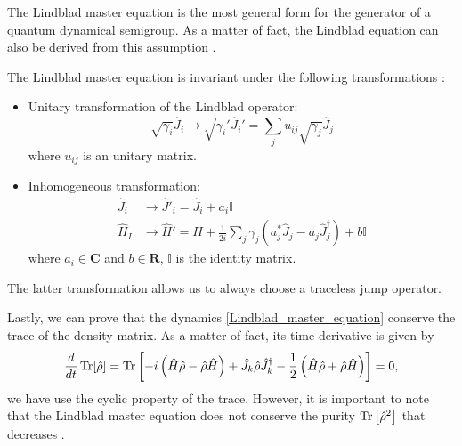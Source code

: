 The Lindblad master equation is the most general form for the generator of a quantum dynamical semigroup. As a matter of fact, the Lindblad equation can also be derived from this assumption \cite{Breuer-Petruccione}.

The Lindblad master equation is invariant under the following transformations \cite{Breuer-Petruccione}:
\begin{itemize}
    \item Unitary transformation of the Lindblad operator:
        \begin{equation}
            \sqrt{\gamma_i}\hat J_i \rightarrow \sqrt{\gamma_i'}\hat J_i' = \sum_j u_{ij}\sqrt{\gamma_j}\hat J_j
        \end{equation}
        where $u_{ij}$ is an unitary matrix.
    \item Inhomogeneous transformation:
        \begin{equation}
            \begin{split}
                \hat J_i &\rightarrow \hat J'_i = \hat J_i + a_i\mathbb{I}\\
                \hat H_I &\rightarrow \hat H' = \hat H + \frac{1}{2i}\sum_j\gamma_j\left(a^*_j\hat J_j -a_j\hat J_j^\dagger\right) + b \mathbb{I}
            \end{split}
        \end{equation}
        where $a_i \in\mathbf{C}$ and $b \in \mathbf{R}$, $\mathbb{I}$ is the identity matrix.
\end{itemize}
The latter transformation allows us to always choose a traceless jump operator.

Lastly, we can prove that the dynamics \eqref{Lindblad_master_equation} conserve the trace of the density matrix. As a matter of fact, its time derivative is given by
\begin{equation}\label{Lindblad_master_equation}
    \frac{d}{dt}\operatorname{Tr}[\hat\rho] = \operatorname{Tr}\left[-i\left(\hat H\hat\rho - \hat\rho\hat H \right) +  \hat J_k \hat\rho \hat J_k^\dagger -\frac{1}{2} \left(\hat H\hat\rho + \hat\rho\hat H\right)\right] = 0,
\end{equation}
we have use the cyclic property of the trace. 
However, it is important to note that the Lindblad master equation does not conserve the purity $\operatorname{Tr}\left[\hat\rho^2\right]$ that decreases \cite{Manzano}. 



